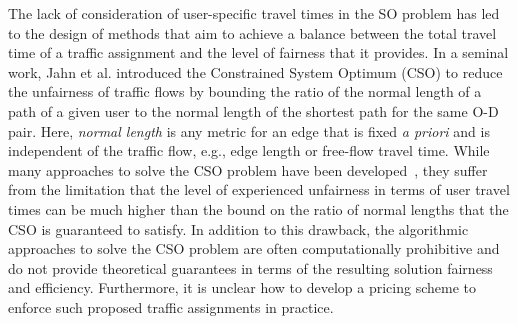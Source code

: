 \documentclass{article}
\newif\ifarxiv   %
\begin{document}
\begin{comment}
\begin{figure}[t]
      \centering
      
      \vspace{-15pt}
      \caption{Cumulative fraction of users keeping within a certain bound of unfairness with respect to the SO solution for six transportation networks (see Table~\ref{tab:problem-instances}).}
      \label{fig:prob_v_unfairness} \vspace{-18pt}
   \end{figure}
\end{comment}




The lack of consideration of user-specific travel times in the \ifarxiv global \fi SO problem has led to the design of methods that aim to achieve a balance between the total travel time of a traffic assignment and the level of fairness that it provides. In a seminal work, Jahn et al. \cite{so-routing-seminal} introduced the Constrained System Optimum (CSO) to reduce the unfairness of traffic flows by bounding the ratio of the normal length of a path of a given user to the normal length of the shortest path for the same O-D pair. Here, \textit{normal length} is any metric for an edge that is fixed \emph{a priori} and is independent of the traffic flow, e.g., edge length or free-flow travel time. While many approaches to solve the CSO problem have been developed~\cite{ANGELELLI20161,ANGELELLI2020,ANGELELLI2018234}, they suffer from the \ifarxiv inherent \fi limitation that the level of experienced unfairness in terms of user travel times can be much higher than the bound on the ratio of normal lengths that the CSO is guaranteed to satisfy. In addition to this drawback, the algorithmic approaches to solve the CSO problem are often computationally prohibitive and do not provide theoretical guarantees in terms of the resulting solution fairness and efficiency. Furthermore, it is unclear how to develop a pricing scheme to enforce such proposed traffic assignments in practice.
\end{document}
